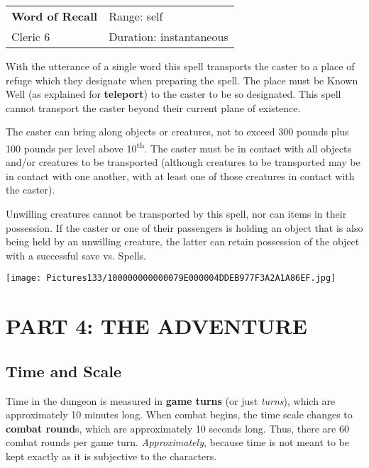 \documentclass[a4paper,twoside,openany,10pt]{book}
\begin{document}
\begin{multicols}{2}
\smallskip\begin{flushleft} 
	\begin{tabularx}{0.45\textwidth}{@{}m{3.5cm}m{5.5cm}@{}} 
		\textbf{Word of Recall} & Range: self\\
Cleric 6 &Duration: instantaneous\\
	\end{tabularx}\end{flushleft}

With the utterance of a single word this spell transports the caster to a place of refuge which they designate when preparing the spell. The place must be Known Well (as explained for \textbf{teleport}) to the caster to be so designated. This spell cannot transport the caster beyond their current plane of existence.

The caster can bring along objects or creatures, not to exceed 300 pounds plus 100 pounds per level above 10\textsuperscript{th}. The caster must be in contact with all objects and/or creatures to be transported (although creatures to be transported may be in contact with one another, with at least one of those creatures in contact with the caster).

Unwilling creatures cannot be transported by this spell, nor can items in their possession. If the caster or one of their passengers is holding an object that is also being held by an unwilling creature, the latter can retain possession of the object with a successful save vs. Spells. 

\end{multicols}

\vfill

\begin{center}
	\texttt{[image: Pictures133/100000000000079E000004DDEB977F3A2A1A86EF.jpg]}
\end{center}

\pagebreak

\section{PART 4: THE ADVENTURE}\label{part-4-the-adventure}

\subsection{Time and Scale}\label{time-and-scale}

Time in the dungeon is measured in \textbf{game turns} (or just \emph{turns}), which are approximately 10 minutes long. When combat begins, the time scale changes to \textbf{combat round}s, which are approximately 10 seconds long. Thus, there are 60 combat rounds per game turn. \emph{Approximately}, because time is not meant to be kept exactly as it is subjective to the characters.
\end{document}
